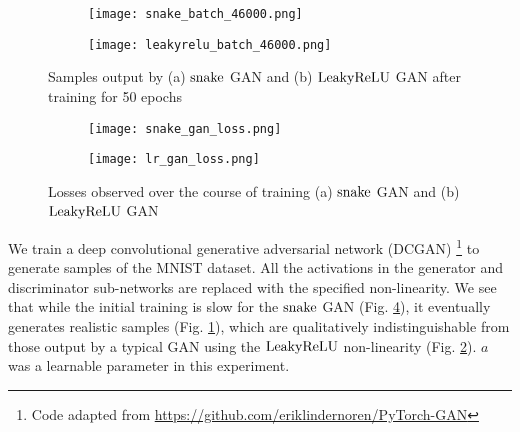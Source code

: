 \begin{figure}[h]
  \centering
  \begin{subfigure}{0.35\textwidth}
  \centering
  \texttt{[image: snake\_batch\_46000.png]} 
  \caption{}
  \label{fig:subim3}
  \end{subfigure}
  \begin{subfigure}{0.35\textwidth}
  \centering
  \texttt{[image: leakyrelu\_batch\_46000.png]}
  \caption{}
  \label{fig:subim4}
  \end{subfigure}
  
  \caption{Samples output by (a) $ \operatorname{snake} $ GAN and (b) $ \operatorname{LeakyReLU} $ GAN after training for 50 epochs}
  \label{fig:gan_outputs}
  \end{figure}
  
  \begin{figure}[h]
    \centering
    \begin{subfigure}{0.45\textwidth}
      \centering
      \texttt{[image: snake\_gan\_loss.png]} 
      \caption{}
      \label{fig:subim5}
    \end{subfigure}
    \begin{subfigure}{0.45\textwidth}
      \centering
      \texttt{[image: lr\_gan\_loss.png]}
      \caption{}
      \label{fig:subim6}
    \end{subfigure}
    \caption{Losses observed over the course of training (a) $ \operatorname{snake} $ GAN and (b) $ \operatorname{LeakyReLU} $ GAN}
    \label{fig:gan_losses}
  \end{figure}

We train a deep convolutional generative adversarial network (DCGAN) \footnote{Code adapted from \url{https://github.com/eriklindernoren/PyTorch-GAN}} \cite{radford2016unsupervised} to generate samples of the MNIST dataset. All the activations in the generator and discriminator sub-networks are replaced with the specified non-linearity. We see that while the initial training is slow for the $ \operatorname{snake} $ GAN (Fig. \ref{fig:subim5}), it eventually generates realistic samples (Fig. \ref{fig:subim3}), which are qualitatively indistinguishable from those output by a typical GAN using the $ \operatorname{LeakyReLU} $ non-linearity (Fig. \ref{fig:subim4}). $a$ was a learnable parameter in this experiment. \\

